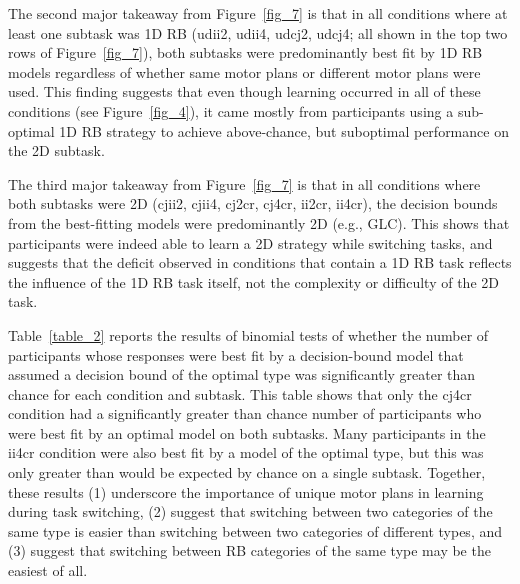 \documentclass[doc, floatsintext]{apa7}
\begin{document}
The second major takeaway from Figure~\ref{fig_7} is that in
all conditions where at least one subtask was 1D RB (udii2,
udii4, udcj2, udcj4; all shown in the top two rows of
Figure~\ref{fig_7}), both subtasks were predominantly best
fit by 1D RB models regardless of whether same motor plans
or different motor plans were used. This finding suggests
that even though learning occurred in all of these
conditions (see Figure~\ref{fig_4}), it came mostly from
participants using a sub-optimal 1D RB strategy to achieve
above-chance, but suboptimal performance on the 2D subtask.

The third major takeaway from Figure~\ref{fig_7} is that in
all conditions where both subtasks were 2D (cjii2, cjii4,
cj2cr, cj4cr, ii2cr, ii4cr), the decision bounds from the
best-fitting models were predominantly 2D (e.g., GLC). This
shows that participants were indeed able to learn a 2D
strategy while switching tasks, and suggests that the
deficit observed in conditions that contain a 1D RB task
reflects the influence of the 1D RB task itself, not the
complexity or difficulty of the 2D task.

Table~\ref{table_2} reports the results of binomial tests of
whether the number of participants whose responses were best
fit by a decision-bound model that assumed a decision bound
of the optimal type was significantly greater than chance
for each condition and subtask. This table shows that only
the cj4cr condition had a significantly greater than chance
number of participants who were best fit by an optimal model
on both subtasks. Many participants in the ii4cr condition
were also best fit by a model of the optimal type, but this
was only greater than would be expected by chance on a
single subtask. Together, these results (1) underscore the
importance of unique motor plans in learning during task
switching, (2) suggest that switching between two categories
of the same type is easier than switching between two
categories of different types, and (3) suggest that
switching between RB categories of the same type may be the
easiest of all.
\end{document}
